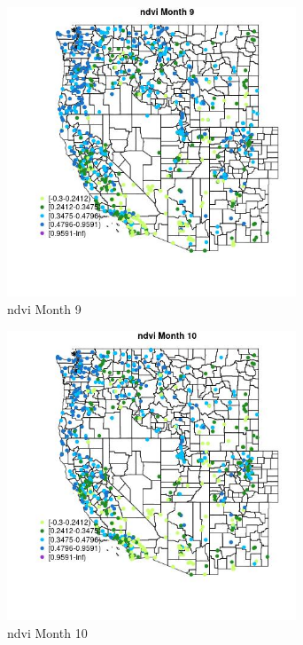 \begin{figure} 
\centering  
\includegraphics[width=0.77\textwidth]{Code_Outputs/Report_ML_input_PM25_Step4_part_e_de_duplicated_aves_compiled_2019-05-21wNAs_MapObsMo9ndvi.jpg} 
\caption{\label{fig:Report_ML_input_PM25_Step4_part_e_de_duplicated_aves_compiled_2019-05-21wNAsMapObsMo9ndvi}ndvi Month 9} 
\end{figure} 
 

\clearpage 

\begin{figure} 
\centering  
\includegraphics[width=0.77\textwidth]{Code_Outputs/Report_ML_input_PM25_Step4_part_e_de_duplicated_aves_compiled_2019-05-21wNAs_MapObsMo10ndvi.jpg} 
\caption{\label{fig:Report_ML_input_PM25_Step4_part_e_de_duplicated_aves_compiled_2019-05-21wNAsMapObsMo10ndvi}ndvi Month 10} 
\end{figure} 
 

